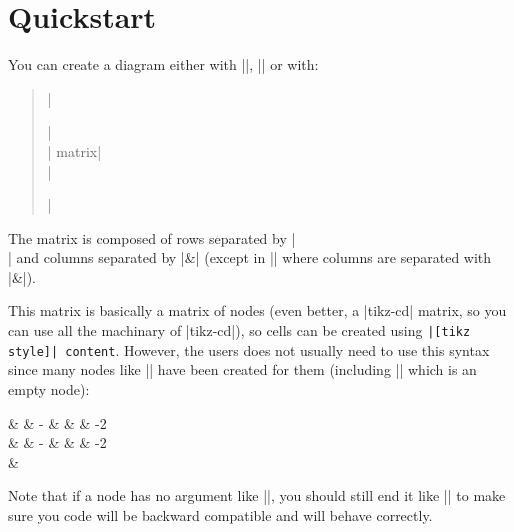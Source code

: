 \documentclass[a4paper,doc2]{ltxdoc} %
\begin{document}
\section{Quickstart}

You can create a diagram either with ||, || or with:
\begin{verse}
  |\begin{ZX}[options]|\\
    |  matrix|\\
  |\end{ZX}|
\end{verse}
The matrix is composed of rows separated by |\\| and columns separated by |&| (except in |\zxAmp| where columns are separated with |\&|).


This matrix is basically a \tikzname{} matrix of nodes (even better, a |tikz-cd| matrix, so you can use all the machinary of |tikz-cd|), so cells can be created using \verb#|[tikz style]| content#. However, the users does not usually need to use this syntax since many nodes like || have been created for them (including |\zxN{}| which is an empty node):

\begin{codeexample}[width=0pt]
\begin{ZX}
  \zxZ{} & \zxZ{\alpha} & \zxZ-{\alpha} & \zxZ{\alpha+\beta} &  & \zxFracZ-{\pi}{2}\\
  \zxX{} & \zxX{\alpha} & \zxX-{\alpha} & \zxX{\alpha+\beta} &  & \zxFracX-{\pi}{2}\\
  \zxN{} & \zxH{}
\end{ZX}
\end{codeexample}

Note that if a node has no argument like |\zxN|, you should still end it like |\zxN{}| to make sure you code will be backward compatible and will behave correctly.
\end{document}
